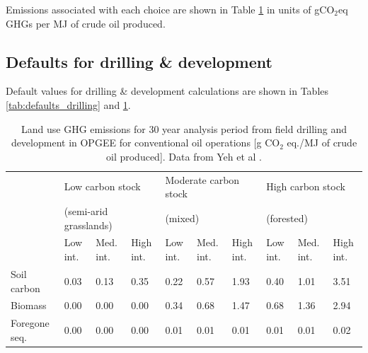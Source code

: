 \documentclass[11pt]{report}
\newcommand{\marg}[1]{{\footnotesize\textit{\textcolor{stanford}{'#1'}}}}
\newcommand{\marginnote}[1]{\marginpar{\marg{#1}}}
\begin{document}
Emissions associated with each choice \marginnote{Emissions Factors Tables 1.6,1.7} are shown in Table \ref{tab:default_land_use_emissions} in units of gCO$_2$eq GHGs per MJ of crude oil produced.

\subsection{Defaults for drilling \& development}

Default values for drilling \& development calculations are shown in Tables \ref{tab:defaults_drilling} and \ref{tab:default_land_use_emissions}. 

\begin{table}
\begin{scriptsize}
\caption{Land use GHG emissions for 30 year analysis period from field drilling and development in OPGEE for conventional oil operations [g CO$_2$ eq./MJ of crude oil produced]. Data from Yeh et al \cite{Yeh2010}.}
\label{tab:default_land_use_emissions}
\begin{tabular}{p{}p{}p{}p{}p{}p{}p{}p{}p{}p{}}
\toprule
& \multicolumn{3}{p{0.25\columnwidth}}{Low carbon stock } & \multicolumn{3}{p{0.25\columnwidth}}{Moderate carbon stock } & \multicolumn{3}{p{0.25\columnwidth}}{High carbon stock}\\
& \multicolumn{3}{p{0.25\columnwidth}}{(semi-arid grasslands)} & \multicolumn{3}{p{0.25\columnwidth}}{(mixed)} & \multicolumn{3}{p{0.25\columnwidth}}{(forested)}\\
\cmidrule{2-4} \cmidrule{5-7} \cmidrule{8-10}
& Low int. & Med. int. & High int. & Low int. & Med. int. & High int. & Low int. & Med. int. & High int.\\
\midrule
Soil carbon & 0.03 & 0.13 & 0.35 & 0.22 & 0.57 & 1.93 & 0.40 & 1.01 & 3.51\\
Biomass & 0.00 & 0.00 & 0.00 & 0.34 & 0.68 & 1.47 & 0.68 & 1.36 & 2.94\\
Foregone seq.\ & 0.00 & 0.00 & 0.00 & 0.01 & 0.01 & 0.01 & 0.01 & 0.01 & 0.02\\
\bottomrule
\end{tabular}
\end{scriptsize}
\end{table}
\end{document}
